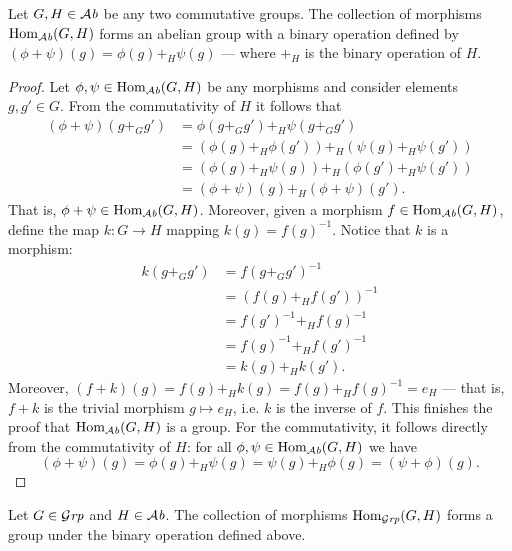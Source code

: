 \begin{proposition}\label{prop: hom-ab-grp}
  Let \(G, H \in {\mathcal{A}\textit{b}}\) be any two commutative groups. The collection of
  morphisms \(\operatorname{Hom}_{\mathcal{A}\textit{b}}(G, H)\) forms an abelian group with a binary operation
  defined by \((\phi + \psi)(g) = \phi(g) +_H \psi(g)\) --- where \(+_H\) is the
  binary operation of \(H\).
\end{proposition}

\begin{proof}
  Let \(\phi, \psi \in \operatorname{Hom}_{\mathcal{A}\textit{b}}(G, H)\) be any morphisms and consider elements
  \(g, g' \in G\). From the commutativity of \(H\) it follows that
  \begin{align*}
    (\phi + \psi)(g +_G g')
    &= \phi(g +_G g') +_H \psi(g +_G g')
    \\
    &= \left(\phi(g) +_H \phi(g')\right) +_H \left(\psi(g) +_H \psi(g')\right)
    \\
    &= \left(\phi(g) +_H \psi(g)\right) +_H \left(\phi(g') +_H \psi(g')\right)
    \\
    &= (\phi + \psi)(g) +_H (\phi + \psi)(g').
  \end{align*}
  That is, \(\phi + \psi \in \operatorname{Hom}_{\mathcal{A}\textit{b}}(G, H)\). Moreover, given a morphism \(f
  \in \operatorname{Hom}_{\mathcal{A}\textit{b}}(G, H)\), define the map \(k: G \to H\) mapping \(k(g) =
  f(g)^{-1}\). Notice that \(k\) is a morphism:
  \begin{align*}
    k(g +_G g')
    &= f(g +_G g')^{-1} \\
    &= (f(g) +_H f(g'))^{-1} \\
    &= f(g')^{-1} +_H f(g)^{-1} \\
    &= f(g)^{-1} +_H f(g')^{-1} \\
    &= k(g) +_H k(g').
  \end{align*}
  Moreover, \((f + k)(g) = f(g) +_H k(g) = f(g) +_H f(g)^{-1} = e_H\) --- that
  is, \(f + k\) is the trivial morphism \(g \mapsto e_H\), i.e. \(k\) is the
  inverse of \(f\). This finishes the proof that \(\operatorname{Hom}_{\mathcal{A}\textit{b}}(G, H)\) is a group.
  For the commutativity, it follows directly from the commutativity of \(H\):
  for all \(\phi, \psi \in \operatorname{Hom}_{\mathcal{A}\textit{b}}(G, H)\) we have
  \[
    (\phi + \psi)(g) = \phi(g) +_H \psi(g) = \psi(g) +_H \phi(g) = (\psi +
    \phi)(g).
  \]
\end{proof}

\begin{corollary}
  Let \(G \in {\mathcal{G}\textit{rp}}\) and \(H \in {\mathcal{A}\textit{b}}\). The collection of morphisms
  \(\operatorname{Hom}_{\mathcal{G}\textit{rp}}(G, H)\) forms a group under the binary operation defined above.
\end{corollary}

